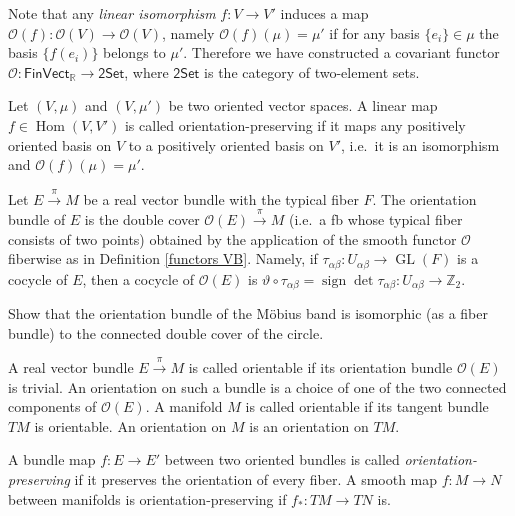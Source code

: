 \documentclass[english,letterpaper]{article}%
\numberwithin{equation}{section}
\numberwithin{figure}{section}
\numberwithin{table}{section}
\theoremstyle{definition}
\theoremstyle{definition}
\theoremstyle{definition}
\theoremstyle{plain}
\theoremstyle{plain}
\theoremstyle{plain}
\theoremstyle{plain}
\theoremstyle{remark}
\theoremstyle{remark}
\DeclareMathOperator{\sign}{sign}
\DeclareMathOperator{\Hom}{Hom}
\DeclareMathOperator{\GL}{GL}
\begin{document}
Note that any \emph{linear isomorphism} $f:V\to V'$ induces a map $\mathcal{O}(f):\mathcal{O}(V)\to\mathcal{O}(V)$, namely $\mathcal{O}(f)(\mu)=\mu'$ if for any basis $\{e_i\}\in\mu$ the basis $\{f(e_i)\}$ belongs to $\mu'$. Therefore we have constructed a covariant functor $\mathcal{O}:\mathsf{FinVect_\mathbb{R}}\to\mathsf{2Set}$, where $\mathsf{2Set}$ is the category of two-element sets.

\begin{defn}
Let $(V,\mu)$ and $(V,\mu')$ be two oriented vector spaces. A linear map $f\in\Hom(V,V')$ is called orientation-preserving if it maps any positively oriented basis on $V$ to a positively oriented basis on $V'$, i.e.\ it is an isomorphism and $\mathcal{O}(f)(\mu)=\mu'$.
\end{defn}


\begin{defn}
Let $E\overset\pi\to M$ be a real vector bundle with the typical fiber $F$. The orientation bundle of $E$ is the double cover $\mathcal{O}(E)\overset{\pi}\to M$ (i.e.\ a \gls{fb} whose typical fiber consists of two points) obtained by the application of the smooth functor $\mathcal{O}$ fiberwise as in Definition \ref{functors VB}. Namely, if $\tau_{\alpha\beta}:U_{\alpha\beta}\to\GL(F)$ is a cocycle of $E$, then a cocycle of $\mathcal{O}(E)$ is $\vartheta\circ\tau_{\alpha\beta}=\sign\det\tau_{\alpha\beta}:U_{\alpha\beta}\to\mathbb{Z}_2$.
\end{defn}

\begin{xca}
Show that the orientation bundle of the M\"obius band is isomorphic (as a fiber bundle) to the connected double cover of the circle.
\end{xca}

\begin{defn}
A real vector bundle $E\overset\pi\to M$ is called orientable if its orientation bundle $\mathcal{O}(E)$ is trivial. An orientation on such a bundle is a choice of one of the two connected components of $\mathcal{O}(E)$. A manifold $M$ is called orientable if its tangent bundle $TM$ is orientable. An orientation on $M$ is an orientation on $TM$.

A bundle map $f:E\to E'$ between two oriented bundles is called \emph{orientation-preserving} if it preserves the orientation of every fiber. A smooth map $f:M\to N$ between manifolds is orientation-preserving if $f_\ast:TM\to TN$ is.
\end{defn}
\end{document}
